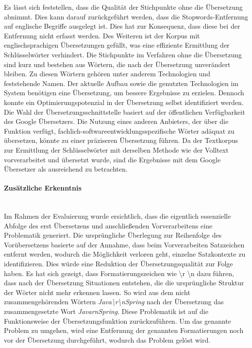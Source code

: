 Es lässt sich feststellen, dass die Qualität der Stichpunkte ohne die Übersetzung abnimmt. Dies kann darauf zurückgeführt werden, dass die Stopwords-Entfernung auf englische Begriffe ausgelegt ist. Dies hat zur Konsequenz, dass diese bei der Entfernung nicht erfasst werden. Des Weiteren ist der Korpus mit englischsprachigen Übersetzungen gefüllt, was eine effiziente Ermittlung der Schlüsselwörter verhindert. Die Stichpunkte im Verfahren ohne die Übersetzung sind kurz und bestehen aus Wörtern, die nach der Übersetzung unverändert bleiben. Zu diesen Wörtern gehören unter anderem Technologien und feststehende Namen. Der aktuelle Aufbau sowie die genutzten Technologien im System benötigen eine Übersetzung, um bessere Ergebnisse zu erzielen. Dennoch konnte ein Optimierungspotenzial in der Übersetzung selbst identifiziert werden. Die Wahl der Übersetzungsschnittstelle basiert auf der öffentlichen Verfügbarkeit des Google Übersetzers. Die Nutzung eines anderen Anbieters, der über die Funktion verfügt, fachlich-softwareentwicklungsspezifische Wörter adäquat zu übersetzen, könnte zu einer präziseren Übersetzung führen. Da der Textkorpus zur Ermittlung der Schlüsselwörter mit derselben Methode wie der Volltext vorverarbeitet und übersetzt wurde, sind die Ergebnisse mit dem Google Übersetzer als ausreichend zu betrachten.
\paragraph{Zusätzliche Erkenntnis}\mbox{}\\
Im Rahmen der Evaluierung wurde ersichtlich, dass die eigentlich essenzielle Abfolge des erst Übersetzens und anschließenden Vorverarbeitens eine Problematik generiert. Die ursprüngliche Überlegung zur Reihenfolge des Vorübersetzens basierte auf der Annahme, dass beim Vorverarbeiten Satzzeichen entfernt werden, wodurch die Möglichkeit verloren geht, einzelne Satzkontexte zu identifizieren. Dies würde eine Reduktion der Übersetzungsqualität zur Folge haben. Es hat sich gezeigt, dass Formatierungszeichen wie \textbackslash r \textbackslash n dazu führen, dass nach der Übersetzung Situationen entstehen, die die ursprüngliche Struktur der Wörter nicht mehr erkennen lassen. So wird aus dem nicht zusammengehörenden Wörtern \emph{Java\textbackslash r\textbackslash nSpring} nach der Übersetzung das zusammengesetzte Wort \emph{JavarnSpring}. Diese Problematik ist auf die Funktionsweise der Übersetzungsfunktion zurückzuführen. Um das genannte Problem zu umgehen, wird eine Entfernung der genannten Formatierungen noch vor der Übersetzung durchgeführt, wodurch das Problem gelöst wird.\\

